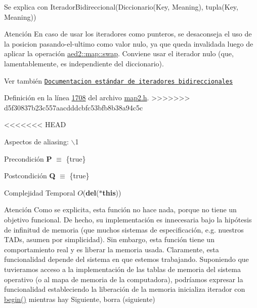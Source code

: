 \begin{DoxyParagraph}{Se explica con}
Iterador\+Bidireccional(Diccionario(Key, Meaning), tupla(Key, Meaning))
\end{DoxyParagraph}
\begin{DoxyAttention}{Atención}
En caso de usar los iteradores como punteros, se desaconseja el uso de la posicion pasando-\/el-\/ultimo como valor nulo, ya que queda invalidada luego de aplicar la operación \hyperlink{classaed2_1_1map_a43ddb71cc91e5c6021a7a1f243d6cc4a_a43ddb71cc91e5c6021a7a1f243d6cc4a}{aed2\+::map\+::swap}. Conviene usar el iterador nulo (que, lamentablemente, es independiente del diccionario).
\end{DoxyAttention}
\begin{DoxySeeAlso}{Ver también}
\href{http://en.cppreference.com/w/cpp/concept/BidirectionalIterator}{\tt Documentacion estándar de iteradores bidireccionales} 
\end{DoxySeeAlso}


Definición en la línea \hyperlink{map2_8h_source_l01708}{1708} del archivo \hyperlink{map2_8h_source}{map2.\+h}.
>>>>>>> d5f30837b23c557aacdddcbfc53bfb8b38a94c5c



<<<<<<< HEAD
\begin{DoxyParagraph}{\-Aspectos de aliasing\-:}
$\backslash$1
\end{DoxyParagraph}
\begin{DoxyPrecond}{\-Precondición}
{\bfseries \-P} $\equiv$ \{true\} 
\end{DoxyPrecond}
\begin{DoxyPostcond}{\-Postcondición}
{\bfseries \-Q} $\equiv$ \{true\}
\end{DoxyPostcond}

\begin{DoxyDescription}
\item[\-Complejidad \-Temporal]$O$({\bfseries del}({\bfseries $\ast$this}))
\end{DoxyDescription}

\begin{DoxyAttention}{\-Atención}
\-Como se explicita, esta función no hace nada, porque no tiene un objetivo funcional. \-De hecho, su implementación es innecesaria bajo la hipótesis de infinitud de memoria (que muchos sistemas de especificación, e.\-g. nuestros \-T\-A\-Ds, asumen por simplicidad). \-Sin embargo, esta función tiene un comportamiento real y es liberar la memoria usada. \-Claramente, esta funcionalidad depende del sistema en que estemos trabajando. \-Suponiendo que tuvieramos acceso a la implementación de las tablas de memoria del sistema operativo (o al mapa de memoria de la computadora), podríamos expresar la funcionalidad estableciendo la liberación de la memoria inicializa iterador con \hyperlink{classaed2_1_1iterator_af8901de173468531c58458b581d345a6_af8901de173468531c58458b581d345a6}{begin()} mientras hay \-Siguiente, borra (siguiente) 
\end{DoxyAttention}


